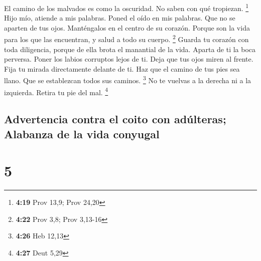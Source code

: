  El camino de los malvados es como la oscuridad. No saben
con qué tropiezan. \footnote{\textbf{4:19} Prov 13,9; Prov 24,20}
 Hijo mío, atiende a mis palabras. Poned el oído en mis
palabras.  Que no se aparten de tus ojos. Manténgalos en
el centro de su corazón.  Porque son la vida para los que
las encuentran, y salud a todo su cuerpo. \footnote{\textbf{4:22} Prov
  3,8; Prov 3,13-16}  Guarda tu corazón con toda
diligencia, porque de ella brota el manantial de la vida.
 Aparta de ti la boca perversa. Poner los labios
corruptos lejos de ti.  Deja que tus ojos miren al
frente. Fija tu mirada directamente delante de ti.  Haz
que el camino de tus pies sea llano. Que se establezcan todos sus
caminos. \footnote{\textbf{4:26} Heb 12,13}  No te
vuelvas a la derecha ni a la izquierda. Retira tu pie del mal.
\footnote{\textbf{4:27} Deut 5,29}

\hypertarget{advertencia-contra-el-coito-con-aduxfalteras-alabanza-de-la-vida-conyugal}{%
\subsection{Advertencia contra el coito con adúlteras; Alabanza de la
vida
conyugal}\label{advertencia-contra-el-coito-con-aduxfalteras-alabanza-de-la-vida-conyugal}}

\hypertarget{section-4}{%
\section{5}\label{section-4}}

